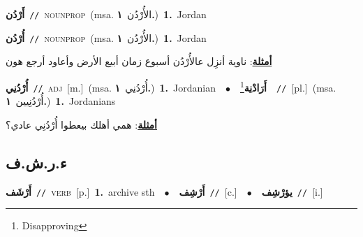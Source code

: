 \documentclass[10pt,a4paper,twoside]{article} %
\begin{document}
\begin{multicols}{2}
{\setlength\topsep{0pt}\textbf{\foreignlanguage{arabic}{أَرْدُن}}\ {\color{gray}\texttt{//}\color{black}}\ \textsc{noun\textunderscore prop}\ \color{gray}(msa. \foreignlanguage{arabic}{الأُرْدُن}~\foreignlanguage{arabic}{\textbf{١.}})\color{black}\ \textbf{1.}~Jordan\ } \vspace{2mm}

{\setlength\topsep{0pt}\textbf{\foreignlanguage{arabic}{أُرْدُن}}\ {\color{gray}\texttt{//}\color{black}}\ \textsc{noun\textunderscore prop}\ \color{gray}(msa. \foreignlanguage{arabic}{الأُرْدُن}~\foreignlanguage{arabic}{\textbf{١.}})\color{black}\ \textbf{1.}~Jordan\  \begin{flushright}\color{gray}\foreignlanguage{arabic}{\textbf{\underline{\foreignlanguage{arabic}{أمثلة}}}: ناوية أنزِل عالأُرْدُن أسبوع زمان أبيع الأرض وأعاود أرجع هون}\end{flushright}\color{black}} \vspace{2mm}

{\setlength\topsep{0pt}\textbf{\foreignlanguage{arabic}{أُرْدُنِي}}\ {\color{gray}\texttt{//}\color{black}}\ \textsc{adj}\ [m.]\ \color{gray}(msa. \foreignlanguage{arabic}{أُرْدُنِي}~\foreignlanguage{arabic}{\textbf{١.}})\color{black}\ \textbf{1.}~Jordanian\ \ $\bullet$\ \ \setlength\topsep{0pt}\textbf{\foreignlanguage{arabic}{أَرَادْنِة}}\footnote{Disapproving}\ \ {\color{gray}\texttt{//}\color{black}}\ [pl.]\ \color{gray}(msa. \foreignlanguage{arabic}{أُرْدُنِيين}~\foreignlanguage{arabic}{\textbf{١.}})\color{black}\ \textbf{1.}~Jordanians\  \begin{flushright}\color{gray}\foreignlanguage{arabic}{\textbf{\underline{\foreignlanguage{arabic}{أمثلة}}}: همي أهلك بيعطوا أُرْدُنِي عادي؟}\end{flushright}\color{black}} \vspace{2mm}

\vspace{-3mm}
\subsection*{\color{blue}\foreignlanguage{arabic}{ء.ر.ش.ف}\color{blue}{}} 

{\setlength\topsep{0pt}\textbf{\foreignlanguage{arabic}{أَرْشَف}}\ {\color{gray}\texttt{//}\color{black}}\ \textsc{verb}\ [p.]\ \textbf{1.}~archive sth\ \ $\bullet$\ \ \setlength\topsep{0pt}\textbf{\foreignlanguage{arabic}{أَرْشِف}}\ {\color{gray}\texttt{//}\color{black}}\ [c.]\ \ $\bullet$\ \ \setlength\topsep{0pt}\textbf{\foreignlanguage{arabic}{يؤرْشِف}}\ {\color{gray}\texttt{//}\color{black}}\ [i.]\ } \vspace{2mm}


\end{multicols}
\end{document}
